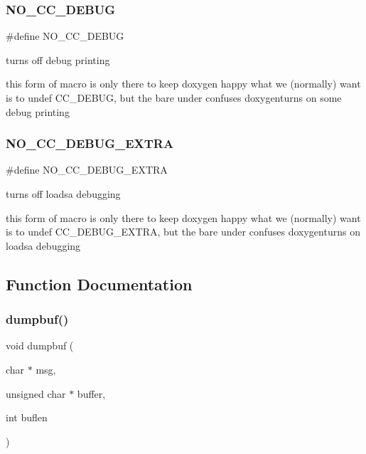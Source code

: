 \subsubsection{\texorpdfstring{N\+O\+\_\+\+C\+C\+\_\+\+D\+E\+B\+UG}{NO\_CC\_DEBUG}}
{\footnotesize\ttfamily \#define N\+O\+\_\+\+C\+C\+\_\+\+D\+E\+B\+UG}



turns off debug printing 

this form of macro is only there to keep doxygen happy what we (normally) want is to undef C\+C\+\_\+\+D\+E\+B\+UG, but the bare under confuses doxygenturns on some debug printing \mbox{\label{cs2014coin-int_8h_afa38166e59791a080ff9c3096c84146a}} 
\subsubsection{\texorpdfstring{N\+O\+\_\+\+C\+C\+\_\+\+D\+E\+B\+U\+G\+\_\+\+E\+X\+T\+RA}{NO\_CC\_DEBUG\_EXTRA}}
{\footnotesize\ttfamily \#define N\+O\+\_\+\+C\+C\+\_\+\+D\+E\+B\+U\+G\+\_\+\+E\+X\+T\+RA}



turns off loadsa debugging 

this form of macro is only there to keep doxygen happy what we (normally) want is to undef C\+C\+\_\+\+D\+E\+B\+U\+G\+\_\+\+E\+X\+T\+RA, but the bare under confuses doxygenturns on loadsa debugging 

\subsection{Function Documentation}
\mbox{\label{cs2014coin-int_8h_afd151090a1b9f8e9a800daa05be4bbf6}} 
\subsubsection{\texorpdfstring{dumpbuf()}{dumpbuf()}}
{\footnotesize\ttfamily void dumpbuf (\begin{DoxyParamCaption}\item[{char $\ast$}]{msg,  }\item[{unsigned char $\ast$}]{buffer,  }\item[{int}]{buflen }\end{DoxyParamCaption})}



